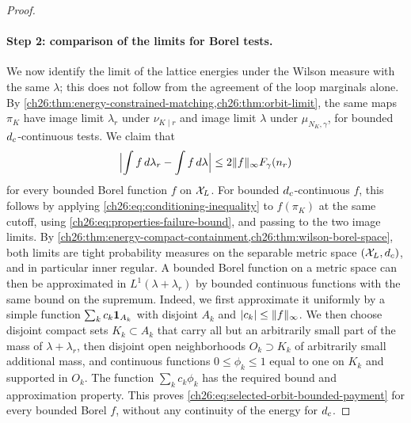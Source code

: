 \begin{proof}
\paragraph{Step 2: comparison of the limits for Borel tests.}
We now identify the limit of the lattice energies under the Wilson measure with the same $\lambda$; this does not follow from the agreement of the loop marginals alone. By \cref{ch26:thm:energy-constrained-matching,ch26:thm:orbit-limit}, the same maps $\pi_K$ have image limit $\lambda_r$ under $\nu_{K\mid r}$ and image limit $\lambda$ under $\mu_{N_K,\gamma}$, for bounded $d_c$-continuous tests. We claim that
\begin{equation}\label{ch26:eq:selected-orbit-bounded-payment}
 \Bigl\lvert\int f\,d\lambda_r-\int f\,d\lambda\Bigr\rvert\le2\lVert f\rVert_\infty F_\gamma(n_r)
\end{equation}
for every bounded Borel function $f$ on $\mathcal X_L$. For bounded $d_c$-continuous $f$, this follows by applying \eqref{ch26:eq:conditioning-inequality} to $f(\pi_K)$ at the same cutoff, using \eqref{ch26:eq:properties-failure-bound}, and passing to the two image limits. By \cref{ch26:thm:energy-compact-containment,ch26:thm:wilson-borel-space}, both limits are tight probability measures on the separable metric space $(\mathcal X_L,d_c)$, and in particular inner regular. A bounded Borel function on a metric space can then be approximated in $L^1(\lambda+\lambda_r)$ by bounded continuous functions with the same bound on the supremum. Indeed, we first approximate it uniformly by a simple function $\sum_kc_k\mathbf 1_{A_k}$ with disjoint $A_k$ and $\lvert c_k\rvert\le\lVert f\rVert_\infty$. We then choose disjoint compact sets $K_k\subset A_k$ that carry all but an arbitrarily small part of the mass of $\lambda+\lambda_r$, then disjoint open neighborhoods $O_k\supset K_k$ of arbitrarily small additional mass, and continuous functions $0\le\phi_k\le1$ equal to one on $K_k$ and supported in $O_k$. The function $\sum_kc_k\phi_k$ has the required bound and approximation property. This proves \eqref{ch26:eq:selected-orbit-bounded-payment} for every bounded Borel $f$, without any continuity of the energy for $d_c$.


\end{proof}
